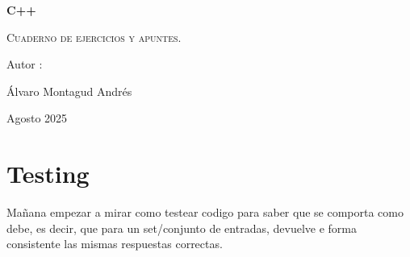 \documentclass[]{article}
\begin{document}
	\begin{titlepage}
		\centering
		{\bfseries\huge C++ \par}
		\vspace{1cm}
		{\scshape\Large Cuaderno de ejercicios y apuntes.}
		\vfill
		{\large Autor : \par}
		{\large \'Alvaro Montagud Andr\'es \par}
		\vfill
		{\large Agosto 2025 \par}
	\end{titlepage}
	
	\section{Testing}
	Mañana empezar a mirar como testear codigo para saber que se comporta como debe, es decir, que para un set/conjunto de entradas, devuelve e forma consistente las mismas respuestas correctas.
\end{document}
